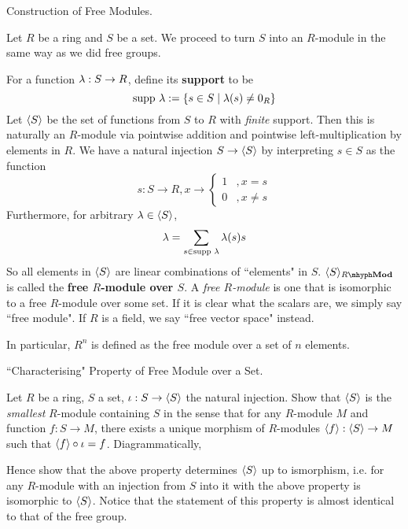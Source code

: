 \documentclass[../book.tex]{subfiles}
\begin{document}
\begin{ex} \dolater Construction of Free Modules. 

    Let $R$ be a ring and $S$ be a set. 
    We proceed to turn $S$ into an $R$-module in the same way as we did free groups.
    
    For a function $\lambda : S \to R$, define its \textbf{support} to be \[
        \text{supp } \lambda := \{s \in S \mid \lambda(s) \neq 0_R\}
    \]
    Let $\langle S \rangle$ be the set of functions from $S$ to $R$ with \emph{finite} support.
    Then this is naturally an $R$-module via pointwise addition and
    pointwise left-multiplication by elements in $R$. 
    We have a natural injection $S \to \langle S \rangle$ by
    interpreting $s \in S$ as the function \[
        s : S \to R, x \to \begin{cases}
            1   &, x = s \\
            0   &, x \neq s
        \end{cases}
    \]
    Furthermore, for arbitrary $\lambda \in \langle S \rangle$, \[
        \lambda = \sum_{s \in \text{supp } \lambda} \lambda(s) s
    \]
    So all elements in $\langle S \rangle$ are linear combinations of ``elements" in $S$. 
    $\< S\>_{\mod{R}}$ is called the \textbf{free $R$-module over $S$}.
    A \emph{free $R$-module} is one that is isomorphic 
    to a free $R$-module over some set. 
    If it is clear what the scalars are, we simply say ``free module".
    If $R$ is a field, we say ``free vector space" instead. 
    
    In particular, $R^n$ is defined as the free module over a set of $n$ elements.
\end{ex}

\begin{ex} \dolater ``Characterising" Property of Free Module over a Set. 

    Let $R$ be a ring, $S$ a set, $\iota : S \to \langle S\rangle$ the natural injection.
    Show that $\langle S\rangle$ is the \emph{smallest} $R$-module containing $S$
    in the sense that for any $R$-module $M$ and function $f : S \to M$, 
    there exists a unique morphism of $R$-modules
    $\langle f\rangle : \langle S\rangle \to M$ such that $\langle f\rangle \circ \iota = f$. 
    Diagrammatically, 
    \begin{figure} [ht]
        \centering
    \end{figure}
    
    Hence show that the above property determines $\langle S\rangle$ up to ismorphism, i.e.
    for any $R$-module with an injection from $S$ into it with the above property
    is isomorphic to $\langle S\rangle$. 
    Notice that the statement of this property is almost
    identical to that of the free group.
\end{ex}
\end{document}
